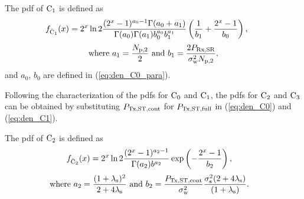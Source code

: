 \begin{lemma} \label{lm:lem4}
\normalfont
The pdf of $\text{C}_{\text{1}}$ is defined as \cite{Kaushik16}
\begin{align}
\hspace{-2mm}
\dco(x) &= 2^x \ln 2 \frac{(2^x - 1)^{a_0 - 1} \Gamma(a_0 + a_1)}{\Gamma(a_0) \Gamma(a_1) b_0^{a_0} b_1^{a_1}} \left(\frac{1}{b_1} + \frac{2^x - 1}{b_0}\right), \label{eq:den_C1}
\end{align}
\vspace{-4mm}
\begin{align}
\text{where  } a_1 = \frac{N_{\text{p,2}}}{2}  \text{  and  } b_1 = \frac{2 P_{\text{Rx,SR}}}{\sigma^2_{\text{w}} N_{\text{p,2}}}, \label{eq:den_C1_para} 
\end{align}
and $a_0$, $b_0$ are defined in (\ref{eq:den_C0_para}).
\end{lemma}
Following the characterization of the pdfs for $\text{C}_{\text{0}}$ and $\text{C}_{\text{1}}$, the pdfs for $\text{C}_{\text{2}}$ and $\text{C}_{\text{3}}$ can be obtained by substituting $P_{\text{Tx,ST,cont}}$ for $P_{\text{Tx,ST,full}}$ in (\ref{eq:den_C0}) and (\ref{eq:den_C1}).
\begin{lemma} \label{lm:lem5}
\normalfont
The pdf of $\text{C}_{\text{2}}$ is defined as
\begin{align}
f_{\hat{\text{C}}_{\text{2}}}(x) &= 2^x \ln 2 \frac{(2^x - 1)^{a_2 - 1}}{\Gamma(a_2) b^{a_2}} \exp\left(-\frac{2^x - 1}{b_2}\right),  \label{eq:den_C2}
\end{align}
\vspace{-4mm}
\begin{align}
\text{where  } a_2 = \frac{(1 + \lambda_{\text{s}})^2}{2 + 4 \lambda_{\text{s}}} &\text{ and } b_2 = \frac{P_{\text{Tx,ST,cont}}}{\sigma^2_{\text{w}}}\frac{\sigma^2_{\text{s}} (2 + 4 \lambda_{\text{s}})}{(1 + \lambda_{\text{s}})}.  \label{eq:den_C2_para} 
\end{align}
\end{lemma}

